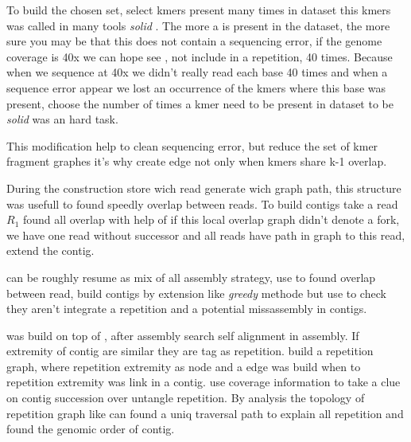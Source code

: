 \documentclass[main]{subfiles}
\begin{document}
To build the chosen \kmers set, \abruijn select kmers present many times in dataset this kmers was called in many tools \textit{solid} \kmers {}. The more a \kmers is present in the dataset, the more sure you may be that this \kmers does not contain a sequencing error, if the genome coverage is 40x we can hope see \kmer, not include in a repetition, 40 times. Because when we sequence at 40x we didn't really read each base 40 times and when a sequence error appear we lost an occurrence of the kmers where this base was present, choose the number of times a kmer need to be present in dataset to be \textit{solid} was an hard task.

This modification help to clean sequencing error, but reduce the set of kmer fragment \DBG graphes it's why  create edge not only when kmers share k-1 overlap. 

During the  construction \abruijn store wich read generate wich graph path, this structure was usefull to found speedly overlap between reads. To build contigs \abruijn take a read $R_1$ found all overlap with help of  if this local overlap graph didn't denote a fork, we have one read without successor and all reads have path in graph to this read, \abruijn extend the contig.

\abruijn can be roughly resume as mix of all assembly strategy, use \DBG to found overlap between read, build contigs by extension like \textit{greedy} methode but use \OLC to check they aren't integrate a repetition and a potential missassembly in contigs.

\flye was build on top of \abruijn, after \abruijn assembly \flye search self alignment in assembly. If extremity of contig are similar they are tag as repetition. \flye build a repetition graph, where repetition extremity as node and a edge was build when to repetition extremity was link in a contig. \flye use coverage information to take a clue on contig succession over untangle repetition. By analysis the topology of repetition graph \flye like \hinge can found a uniq traversal path to explain all repetition and found the genomic order of contig.


\subsection{\wtdbg}
\end{document}
